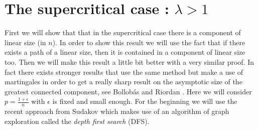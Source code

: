 \section{The supercritical case : $\lambda > 1 $ }
First we will show that that in the supercritical case there is a component of linear size (in $n$). In order to show this result we will use the fact that if there exists a path of a linear size, then it is contained in a component of linear size too. Then we will make this result a little bit better with a very similar proof.
\newline
In fact there exists stronger results that use the same method but make a use of martingales in order to get a really sharp result on the asymptotic size of the greatest connected component, see Bollob\'as and Riordan \cite{BollobRiordan12}.
\newline
Here we will consider $p = \frac{1 + \epsilon}{n}$ with $\epsilon$ is fixed and small enough. 
For the beginning we will use the recent approach from Sudakov \cite{Sudakov} which makes use of an algorithm of graph exploration called the \emph{depth first search} (DFS).

